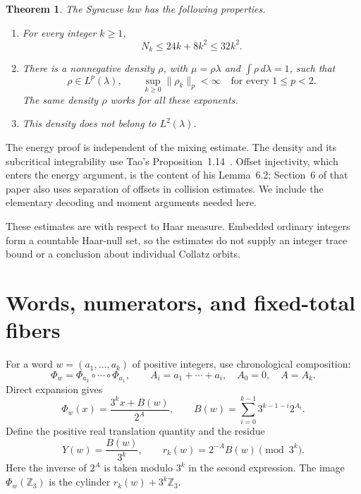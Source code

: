 \documentclass[11pt]{article}
\newtheorem{theorem}{Theorem}[section]
\theoremstyle{remark}
\newcommand{\Zthree}{\mathbb Z_3}
\newcommand{\norm}[2]{\lVert #1\rVert_{#2}}
\begin{document}
\begin{theorem}\label{thm:main}
The Syracuse law has the following properties.
\begin{enumerate}
\item For every integer \(k\geq1\),
\begin{equation}\label{eq:main-energy}
  N_k\leq24k+8k^2\leq32k^2.
\end{equation}
\item There is a nonnegative density \(\rho\), with
\(\mu=\rho\lambda\) and \(\int\rho\,d\lambda=1\), such that
\[
  \rho\in L^p(\lambda),\qquad
  \sup_{k\geq0}\norm{\rho_k}{p}<\infty
  \quad\text{for every }1\leq p<2.
\]
The same density \(\rho\) works for all these exponents.
\item This density does not belong to \(L^2(\lambda)\).
\end{enumerate}
\end{theorem}

The energy proof is independent of the mixing estimate.  The density
and its subcritical integrability use Tao's
Proposition~1.14~\cite{Tao}.  Offset injectivity, which enters the
energy argument, is the content of his Lemma~6.2; Section~6 of that
paper also uses separation of offsets in collision estimates.
We include the elementary decoding and moment arguments needed here.

These estimates are with respect to Haar measure.  Embedded ordinary
integers form a countable Haar-null set, so the estimates do not supply
an integer trace bound or a conclusion about individual Collatz orbits.

\section{Words, numerators, and fixed-total fibers}

For a word \(w=(a_1,\ldots,a_k)\) of positive integers, use
chronological composition:
\[
  \Phi_w=\Phi_{a_k}\circ\cdots\circ\Phi_{a_1},\qquad
  A_i=a_1+\cdots+a_i,\quad A_0=0,\quad A=A_k.
\]
Direct expansion gives
\begin{equation}\label{eq:word-formula}
  \Phi_w(x)=\frac{3^k x+B(w)}{2^A},\qquad
  B(w)=\sum_{i=0}^{k-1}3^{k-1-i}2^{A_i}.
\end{equation}
Define the positive real translation quantity and the residue
\begin{equation}\label{eq:translation-residue}
  Y(w)=\frac{B(w)}{3^k},\qquad
  r_k(w)=2^{-A}B(w)\pmod{3^k}.
\end{equation}
Here the inverse of \(2^A\) is taken modulo \(3^k\) in the
second expression.  The image \(\Phi_w(\Zthree)\) is the cylinder
\(r_k(w)+3^k\Zthree\).
\end{document}
